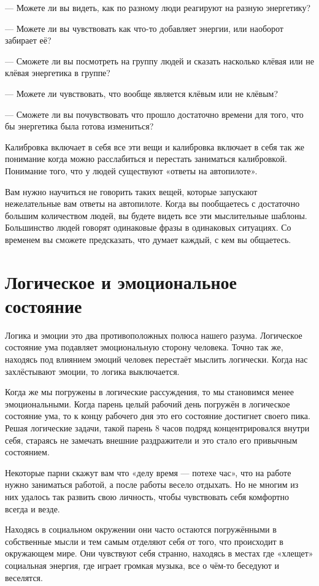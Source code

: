 --- Можете ли вы видеть, как по разному люди реагируют на разную энергетику?

--- Можете ли вы чувствовать как что-то добавляет энергии, или наоборот забирает её?

--- Сможете ли вы посмотреть на группу людей и сказать насколько клёвая или не клёвая энергетика в группе?

--- Можете ли чувствовать, что вообще является клёвым или не клёвым?

--- Сможете ли вы почувствовать что прошло достаточно времени для того, что бы энергетика была готова измениться?

Калибровка включает в себя все эти вещи и калибровка включает в себя так же понимание когда можно расслабиться и перестать заниматься калибровкой. Понимание того, что у людей существуют «ответы на автопилоте».

Вам нужно научиться не говорить таких вещей, которые запускают нежелательные вам ответы на автопилоте. Когда вы пообщаетесь с достаточно большим количеством людей, вы будете видеть все эти мыслительные шаблоны. Большинство людей говорят одинаковые фразы в одинаковых ситуациях. Со временем вы сможете предсказать, что думает каждый, с кем вы общаетесь.
\chapter{Логическое и эмоциональное состояние}

Логика и эмоции это два противоположных полюса нашего разума. Логическое состояние ума подавляет эмоциональную сторону человека. Точно так же, находясь под влиянием эмоций человек перестаёт мыслить логически. Когда нас захлёстывают эмоции, то логика выключается.

Когда же мы погружены в логические рассуждения, то мы становимся менее эмоциональными. Когда парень целый рабочий день погружён в логическое состояние ума, то к концу рабочего дня это его состояние достигнет своего пика. Решая логические задачи, такой парень 8 часов подряд концентрировался внутри себя, стараясь не замечать внешние раздражители и это стало его привычным состоянием.

Некоторые парни скажут вам что «делу время --- потехе час», что на работе нужно заниматься работой, а после работы весело отдыхать. Но не многим из них удалось так развить свою личность, чтобы чувствовать себя комфортно всегда и везде.

Находясь в социальном окружении они часто остаются погружёнными в собственные мысли и тем самым отделяют себя от того, что происходит в окружающем мире. Они чувствуют себя странно, находясь в местах где «хлещет» социальная энергия, где играет громкая музыка, все о чём-то беседуют и веселятся.

